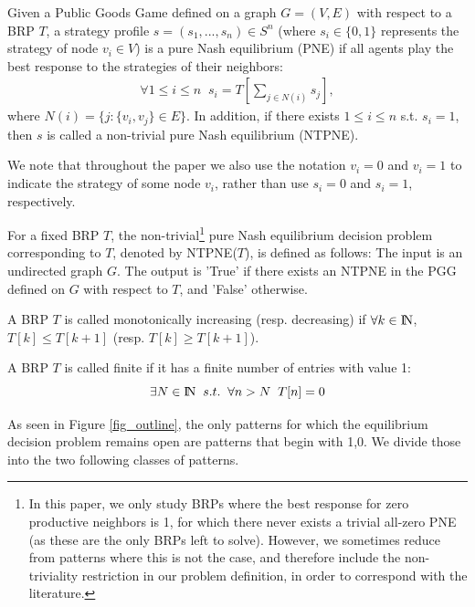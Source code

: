 \documentclass[runningheads]{llncs}
\begin{document}
\begin{definition}
Given a Public Goods Game defined on a graph $G=(V,E)$ with respect to a BRP $T$, a strategy profile $s=(s_1,...,s_n)\in S^n$ (where $s_i\in \{0,1\}$ represents the strategy of node $v_i\in V$) is a pure Nash equilibrium (PNE) if all agents play the best response to the strategies of their neighbors:
\begin{align*}
\forall 1\leq i\leq n\;\; s_i=T[\sum_{j\in N(i)}s_j],
\end{align*}
where $N(i)=\{j:\{v_i,v_j\}\in E\}$.
In addition, if there exists $1\leq i\leq n$ s.t. $s_i=1$, then $s$ is called a non-trivial pure Nash equilibrium (NTPNE).
\end{definition}

We note that throughout the paper we also use the notation $v_i=0$ and $v_i=1$ to indicate the strategy of some node $v_i$, rather than use $s_i=0$ and $s_i=1$, respectively.

\begin{definition}
For a fixed BRP $T$, the non-trivial\footnote{In this paper, we only study BRPs where the best response for zero productive neighbors is 1, for which there never exists a trivial all-zero PNE (as these are the only BRPs left to solve). However, we sometimes reduce from patterns where this is not the case, and therefore include the non-triviality restriction in our problem definition, in order to correspond with the literature.} pure Nash equilibrium decision problem corresponding to $T$, denoted by NTPNE($T$), is defined as follows:
The input is an undirected graph $G$. The output is 'True' if there exists an NTPNE in the PGG defined on $G$ with respect to $T$, and 'False' otherwise.
\end{definition}

\begin{definition}
A BRP $T$ is called monotonically increasing (resp. decreasing) if $\forall k\in {\rm I\!N}$, $T[k]\leq T[k+1]$ (resp. $T[k]\geq T[k+1]$).
\end{definition}

\begin{definition}
A BRP $T$ is called finite if it has a finite number of entries with value 1:
\[\exists N\in {\rm I\!N} \;\;s.t.\;\; \forall n>N \;\; T[n]=0\]
\end{definition}

As seen in Figure \ref{fig_outline}, the only patterns for which the equilibrium decision problem remains open are patterns that begin with 1,0. We divide those into the two following classes of patterns. 
\end{document}
